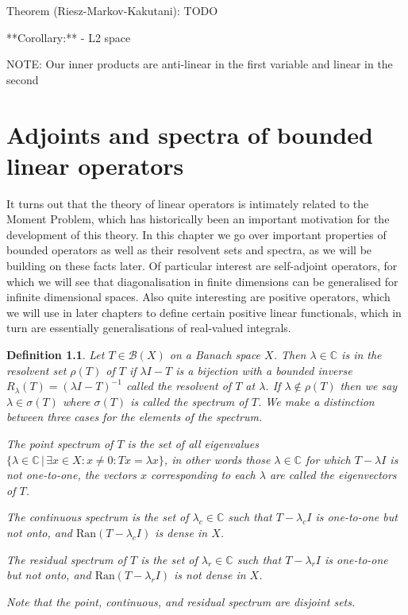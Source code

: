 \documentclass[12pt,oneside]{report}
\newtheorem{defn}[thm]{Definition}
\begin{document}
 Theorem (Riesz-Markov-Kakutani): TODO


**Corollary:** 
- L2 space

 NOTE: Our inner products are anti-linear in the first variable and linear in the second

\chapter{Adjoints and spectra of bounded linear operators}

It turns out that the theory of linear operators is intimately related to the Moment Problem, which has historically been an important motivation for the development of this theory. In this chapter we go over important properties of bounded operators as well as their resolvent sets and spectra, as we will be building on these facts later. Of particular interest are self-adjoint operators, for which we will see that diagonalisation in finite dimensions can be generalised for infinite dimensional spaces. Also quite interesting are positive operators, which we will use in later chapters to define certain positive linear functionals, which in turn are essentially generalisations of real-valued integrals.

\begin{defn}
    Let $T \in \mathscr{B}(X)$ on a Banach space $X$. Then $\lambda \in \mathbb{C}$ is in the resolvent set $\rho(T)$ of $T$ if $\lambda I - T$ is a bijection with a bounded inverse $R_{\lambda}(T) = (\lambda I - T)^{-1}$ called the resolvent of $T$ at $\lambda$. If $\lambda \notin \rho(T)$ then we say $\lambda \in \sigma(T)$ where $\sigma(T)$ is called the spectrum of $T$. We make a distinction between three cases for the elements of the spectrum.
    
    The point spectrum of $T$ is the set of all eigenvalues $\{ \lambda \in \mathbb{C} \, | \, \exists x \in X: x \neq 0: Tx = \lambda x \}$, in other words those $\lambda \in \mathbb{C}$ for which $T - \lambda I$ is not one-to-one, the vectors $x$ corresponding to each $\lambda$ are called the eigenvectors of $T$.
    
    The continuous spectrum is the set of $\lambda_{c} \in \mathbb{C}$ such that $T - \lambda_{c} I$ is one-to-one but not onto, and $\text{Ran}(T - \lambda_{c}I)$ is dense in $X$.
    
    The residual spectrum of $T$ is the set of $\lambda_{r} \in \mathbb{C}$ such that $T - \lambda_{r}I$ is one-to-one but not onto, and $\text{Ran}(T - \lambda_{r}I)$ is not dense in $X$.

    Note that the point, continuous, and residual spectrum are disjoint sets.
\end{defn}
\end{document}
